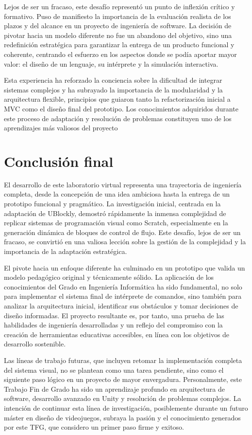 Lejos de ser un fracaso, este desafío representó un punto de inflexión crítico y formativo. Puso de manifiesto la importancia de la evaluación realista de los plazos y del alcance en un proyecto de ingeniería de software. La decisión de pivotar hacia un modelo diferente no fue un abandono del objetivo, sino una redefinición estratégica para garantizar la entrega de un producto funcional y coherente, centrando el esfuerzo en los aspectos donde se podía aportar mayor valor: el diseño de un lenguaje, su intérprete y la simulación interactiva.

Esta experiencia ha reforzado la conciencia sobre la dificultad de integrar sistemas complejos y ha subrayado la importancia de la modularidad y la arquitectura flexible, principios que guiaron tanto la refactorización inicial a MVC como el diseño final del prototipo. Los conocimientos adquiridos durante este proceso de adaptación y resolución de problemas constituyen uno de los aprendizajes más valiosos del proyecto

\section{Conclusión final}

El desarrollo de este laboratorio virtual representa una trayectoria de ingeniería completa, desde la concepción de una idea ambiciosa hasta la entrega de un prototipo funcional y pragmático. La investigación inicial, centrada en la adaptación de UBlockly, demostró rápidamente la inmensa complejidad de replicar sistemas de programación visual como Scratch, especialmente en la generación dinámica de bloques de control de flujo. Este desafío, lejos de ser un fracaso, se convirtió en una valiosa lección sobre la gestión de la complejidad y la importancia de la adaptación estratégica.

El pivote hacia un enfoque diferente ha culminado en un prototipo que valida un modelo pedagógico original y técnicamente sólido. La aplicación de los conocimientos del Grado en Ingeniería Informática ha sido fundamental, no solo para implementar el sistema final de intérprete de comandos, sino también para analizar la arquitectura inicial, identificar sus obstáculos y tomar decisiones de diseño informadas. El proyecto resultante es, por tanto, una prueba de las habilidades de ingeniería desarrolladas y un reflejo del compromiso con la creación de herramientas educativas accesibles, en línea con los objetivos de desarrollo sostenible.

Las líneas de trabajo futuras, que incluyen retomar la implementación completa del sistema visual, no se plantean como una tarea pendiente, sino como el siguiente paso lógico en un proyecto de mayor envergadura. Personalmente, este Trabajo Fin de Grado ha sido un aprendizaje profundo en arquitectura de software, desarrollo avanzado en Unity y resolución de problemas complejos. La intención de continuar esta línea de investigación, posiblemente durante un futuro máster en diseño de videojuegos, subraya la pasión y el conocimiento generados por este TFG, que considero un primer paso firme y exitoso.

